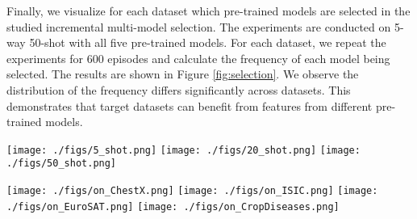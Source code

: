 \documentclass[runningheads]{llncs}
\begin{document}
Finally, we visualize for each dataset which pre-trained models are selected in the studied incremental multi-model selection. The experiments are conducted on 5-way 50-shot with all five pre-trained models. For each dataset, we repeat the experiments for 600 episodes and calculate the frequency of each model being selected. The results are shown in Figure \ref{fig:selection}. We observe the distribution of the frequency differs significantly across datasets. This demonstrates that target datasets can benefit from features from different pre-trained models. 
\begin{figure*}[!th]
    \centering
    \texttt{[image: ./figs/5\_shot.png]}
    \texttt{[image: ./figs/20\_shot.png]}
        \texttt{[image: ./figs/50\_shot.png]}
    \caption{Relative change of pre-trained network layers for single model transfer.}
    \label{fig:layer_transfer}
\end{figure*}



\begin{figure*}[!th]
    \centering
    \texttt{[image: ./figs/on\_ChestX.png]}
        \texttt{[image: ./figs/on\_ISIC.png]}
    \texttt{[image: ./figs/on\_EuroSAT.png]}
        \texttt{[image: ./figs/on\_CropDiseases.png]}
    \caption{Frequency of source model selection for each dataset in the benchmark.}
    \label{fig:selection}
\end{figure*}


\iffalse
\begin{table}[!th]
\centering
{}
\caption{Number of models' effect on test accuracy.}
\label{tab:num}
\end{table}
\end{document}
